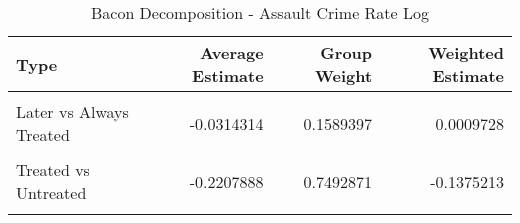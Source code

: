 \begin{table}[H]

\caption{\label{tab:tab:bacondecompositionAssault}Bacon Decomposition - Assault Crime Rate Log}
\centering
\begin{tabular}[t]{lrrr}
\toprule
Type & Average Estimate & Group Weight & Weighted Estimate\\
\midrule
\cellcolor{gray!6}{Earlier vs Later Treated} & \cellcolor{gray!6}{0.1487745} & \cellcolor{gray!6}{0.0683810} & \cellcolor{gray!6}{0.0079628}\\
Later vs Always Treated & -0.0314314 & 0.1589397 & 0.0009728\\
\cellcolor{gray!6}{Later vs Earlier Treated} & \cellcolor{gray!6}{-0.0174274} & \cellcolor{gray!6}{0.0233921} & \cellcolor{gray!6}{-0.0034427}\\
Treated vs Untreated & -0.2207888 & 0.7492871 & -0.1375213\\
\cellcolor{gray!6}{Total TWFE} & \cellcolor{gray!6}{NaN} & \cellcolor{gray!6}{NaN} & \cellcolor{gray!6}{-0.1320284}\\
\bottomrule
\end{tabular}
\end{table}
